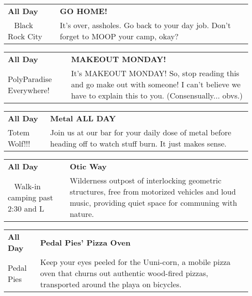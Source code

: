\begin{tabular}{ p{1in} p{2.2in} }
    \textbf{All Day} & \textbf{GO HOME!} \\
    ~ \newline Black Rock City & It's over, assholes. Go back to your day job. Don't forget to MOOP your camp, okay? \\
    \hline 
\end{tabular}
    
\begin{tabular}{ p{1in} p{2.2in} }
    \textbf{All Day} & \textbf{MAKEOUT MONDAY!} \\
    PolyParadise \newline Everywhere! & It's MAKEOUT MONDAY! So, stop reading this and go make out with someone! I can't believe we have to explain this to you. (Consensually... obvs.) \\
    \hline 
\end{tabular}
    
\begin{tabular}{ p{1in} p{2.2in} }
    \textbf{All Day} & \textbf{Metal ALL DAY } \\
    Totem Wolf!!! \newline  & Join us at our bar for your daily dose of metal before heading off to watch stuff burn. It just makes sense. \\
    \hline 
\end{tabular}
    
\begin{tabular}{ p{1in} p{2.2in} }
    \textbf{All Day} & \textbf{Otic Way} \\
    ~ \newline Walk-in camping past 2:30 and L & Wilderness outpost of interlocking geometric structures, free from motorized vehicles and loud music, providing quiet space for communing with nature. \\
    \hline 
\end{tabular}
    
\begin{tabular}{ p{1in} p{2.2in} }
    \textbf{All Day} & \textbf{Pedal Pies' Pizza Oven} \\
    Pedal Pies \newline  & Keep your eyes peeled for the Uuni-corn, a mobile pizza oven that churns out authentic wood-fired pizzas, transported around the playa on bicycles. \\
    \hline 
\end{tabular}
    
